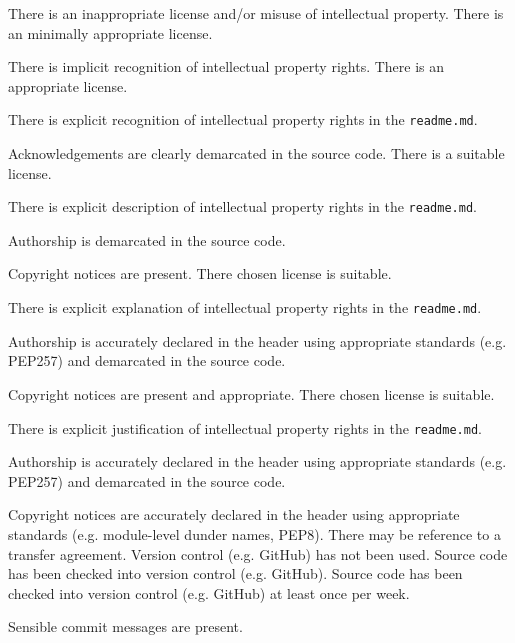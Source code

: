 \documentclass{../../fal_assignment}
\begin{document}
\begin{markingrubric}
        \grade\fail There is an inappropriate license and/or misuse of intellectual property.
        \grade There is an minimally appropriate license.
            \par There is implicit recognition of intellectual property rights.
        \grade There is an appropriate license. 
            \par There is explicit recognition of intellectual property rights in the \texttt{readme.md}.
            \par Acknowledgements are clearly demarcated in the source code.
        \grade There is a suitable license.
            \par There is explicit description of intellectual property rights in the \texttt{readme.md}.
            \par Authorship is demarcated in the source code.
            \par Copyright notices are present.
        \grade There chosen license is suitable. 
            \par There is explicit explanation of intellectual property rights in the \texttt{readme.md}.
            \par Authorship is accurately declared in the header using appropriate standards (e.g. PEP257) and demarcated in the source code.
            \par Copyright notices are present and appropriate.
        \grade There chosen license is suitable.
            \par There is explicit justification of intellectual property rights in the \texttt{readme.md}.
            \par Authorship is accurately declared in the header using appropriate standards (e.g. PEP257) and demarcated in the source code.
            \par Copyright notices are accurately declared in the header using appropriate standards (e.g. module-level dunder names, PEP8). There may be reference to a transfer agreement.
%
        \grade\fail Version control (e.g. GitHub) has not been used.
        \grade Source code has been checked into version control (e.g. GitHub).
        \grade Source code has been checked into version control (e.g. GitHub) at least once per week.
            \par Sensible commit messages are present.

\end{markingrubric}
\end{document}
